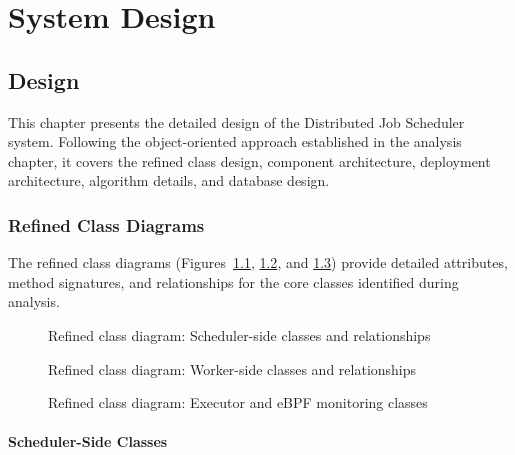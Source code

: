 \chapter{System Design}

\section{Design}

This chapter presents the detailed design of the Distributed Job Scheduler system. Following the object-oriented approach established in the analysis chapter, it covers the refined class design, component architecture, deployment architecture, algorithm details, and database design.

\subsection{Refined Class Diagrams}

The refined class diagrams (Figures~\ref{fig:class-design}, \ref{fig:class-design-worker}, and \ref{fig:class-design-executor-ebpf}) provide detailed attributes, method signatures, and relationships for the core classes identified during analysis.

\begin{figure}[htbp]
	\centering
	\caption{Refined class diagram: Scheduler-side classes and relationships}
	\label{fig:class-design}
\end{figure}

\begin{figure}[htbp]
	\centering
	\caption{Refined class diagram: Worker-side classes and relationships}
	\label{fig:class-design-worker}
\end{figure}

\begin{figure}[htbp]
	\centering
	\caption{Refined class diagram: Executor and eBPF monitoring classes}
	\label{fig:class-design-executor-ebpf}
\end{figure}

\subsubsection{Scheduler-Side Classes}

